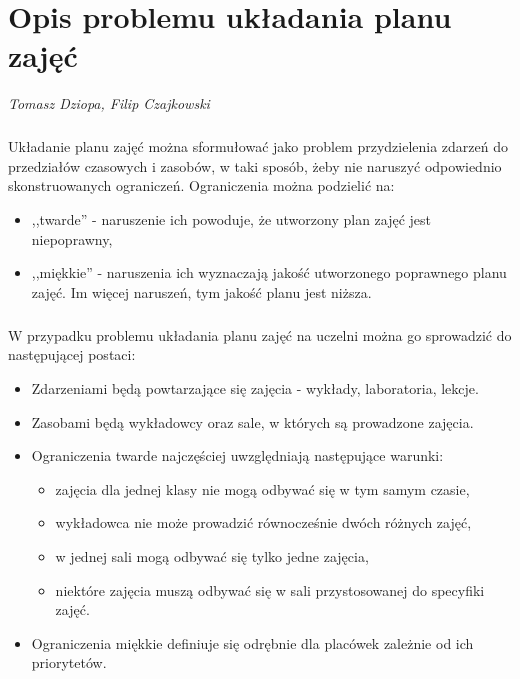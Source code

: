 \chapter{Opis problemu układania planu zajęć}
\textit{Tomasz Dziopa, Filip Czajkowski}
\paragraph{}Układanie planu zajęć można sformułować jako problem przydzielenia zdarzeń do przedziałów czasowych i zasobów, w taki sposób, żeby nie naruszyć odpowiednio skonstruowanych ograniczeń. Ograniczenia można podzielić na:
\begin{itemize}
\item ,,twarde'' - naruszenie ich powoduje, że utworzony plan zajęć jest niepoprawny,
\item ,,miękkie'' - naruszenia ich wyznaczają jakość utworzonego poprawnego planu zajęć. Im więcej naruszeń, tym jakość planu jest niższa.
\end{itemize}
\paragraph{}W przypadku problemu układania planu zajęć na uczelni można go sprowadzić do następującej postaci:
\begin{itemize}
\item Zdarzeniami będą powtarzające się zajęcia - wykłady, laboratoria, lekcje.
\item Zasobami będą wykładowcy oraz sale, w których są prowadzone zajęcia.
\item Ograniczenia twarde najczęściej uwzględniają następujące warunki:
	\begin{itemize}
	\item zajęcia dla jednej klasy nie mogą odbywać się w tym samym czasie,
	\item wykładowca nie może prowadzić równocześnie dwóch różnych zajęć,
	\item w jednej sali mogą odbywać się tylko jedne zajęcia,
	\item niektóre zajęcia muszą odbywać się w sali przystosowanej do specyfiki zajęć.
	\end{itemize}
\item Ograniczenia miękkie definiuje się odrębnie dla placówek zależnie od ich priorytetów.
\end{itemize}

